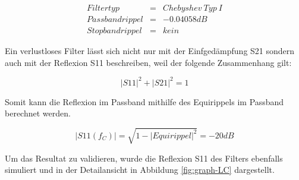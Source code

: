 \begin{mdframed}
    \begin{equation*} 
        \begin{array}{rclcl} 
            Filtertyp & = & Chebyshev\ Typ\ I\\
            Passbandrippel & = & -0.04058 dB \\ 
            Stopbandrippel & = & kein 
        \end{array} 
    \end{equation*} 
\end{mdframed}

Ein verlustloses Filter  lässt  sich  nicht  nur  mit  der  Einfgedämpfung S21
sondern auch mit der Reflexion S11 beschreiben, weil der folgende Zusammenhang
gilt:

\begin{equation}
    {|S11|}^2 + {|S21|}^2 = 1
\end{equation}

Somit  kann  die  Reflexion im Passband mithilfe des Equirippels  im  Passband
berechnet werden.

\begin{equation}
    |S11(f_C)| = \sqrt{1-{|Equirippel|}^2} = -20 dB
\end{equation}

Um das Resultat zu validieren, wurde die Reflexion S11  des  Filters ebenfalls
simuliert   und   in  der  Detailansicht   in   Abbildung   \ref{fig:graph-LC}
dargestellt.

